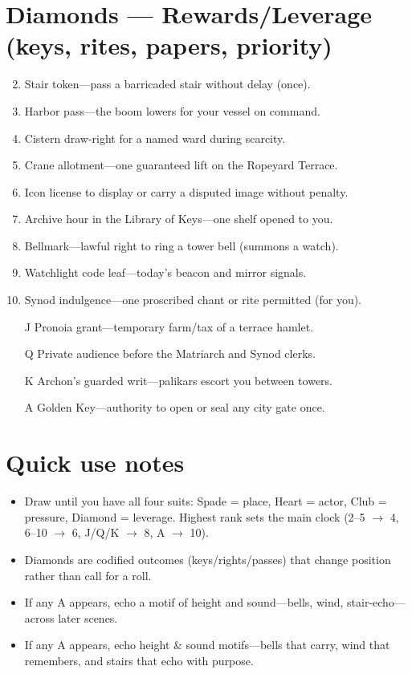 \section*{Diamonds --- Rewards/Leverage (keys, rites, papers, priority)}
\label{sec:thepyrgos-rewards}
\begin{enumerate}
\setcounter{enumi}{1}
\item Stair token---pass a barricaded stair without delay (once).
\item Harbor pass---the boom lowers for your vessel on command.
\item Cistern draw-right for a named ward during scarcity.
\item Crane allotment---one guaranteed lift on the Ropeyard Terrace.
\item Icon license to display or carry a disputed image without penalty.
\item Archive hour in the Library of Keys---one shelf opened to you.
\item Bellmark---lawful right to ring a tower bell (summons a watch).
\item Watchlight code leaf---today's beacon and mirror signals.
\item Synod indulgence---one proscribed chant or rite permitted (for you).
\item[J] Pronoia grant---temporary farm/tax of a terrace hamlet.
\item[Q] Private audience before the Matriarch and Synod clerks.
\item[K] Archon's guarded writ---palikars escort you between towers.
\item[A] Golden Key---authority to open or seal any city gate once.
\end{enumerate}

\section*{Quick use notes}
\label{sec:thepyrgos-quick-use}
\begin{itemize}
\item Draw until you have all four suits: Spade = place, Heart = actor, Club = pressure, Diamond = leverage. Highest rank sets the main clock (2--5 $\rightarrow$ 4, 6--10 $\rightarrow$ 6, J/Q/K $\rightarrow$ 8, A $\rightarrow$ 10).
\item Diamonds are codified outcomes (keys/rights/passes) that change position rather than call for a roll.
\item If any A appears, echo a motif of height and sound---bells, wind, stair-echo---across later scenes.
\item If any A appears, echo height \& sound motifs---bells that carry, wind that remembers, and stairs that echo with purpose.
\end{itemize}

